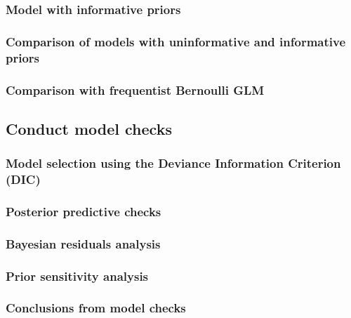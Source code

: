 \documentclass[
]{book}
\begin{document}
\hypertarget{bern-inf-priors}{%
\subsubsection{Model with informative priors}\label{bern-inf-priors}}

\hypertarget{bern-prior-comp}{%
\subsubsection{Comparison of models with uninformative and informative
priors}\label{bern-prior-comp}}

\hypertarget{bern-freq-comp}{%
\subsubsection{Comparison with frequentist Bernoulli
GLM}\label{bern-freq-comp}}

\hypertarget{conduct-model-checks-3}{%
\subsection{Conduct model checks}\label{conduct-model-checks-3}}

\hypertarget{bern-dic}{%
\subsubsection{Model selection using the Deviance Information Criterion
(DIC)}\label{bern-dic}}

\hypertarget{bern-ppc}{%
\subsubsection{Posterior predictive checks}\label{bern-ppc}}

\hypertarget{bern-resids}{%
\subsubsection{Bayesian residuals analysis}\label{bern-resids}}

\hypertarget{bern-sens}{%
\subsubsection{Prior sensitivity analysis}\label{bern-sens}}

\hypertarget{bern-checkconc}{%
\subsubsection{Conclusions from model checks}\label{bern-checkconc}}
\end{document}

